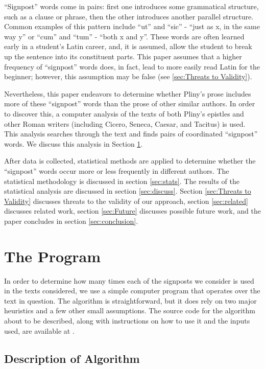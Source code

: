 ``Signpost'' words come in pairs: first one introduces some grammatical structure, such as a clause or phrase, then the other introduces another parallel structure. Common examples of this pattern include ``ut'' and ``sic'' - ``just as x, in the same way y'' or ``cum'' and ``tum'' - ``both x and y''. These words are often learned early in a student's Latin career, and, it is assumed, allow the student to break up the sentence into its constituent parts. This paper assumes that a higher frequency of ``signpost'' words does, in fact, lead to more easily read Latin for the beginner; however, this assumption may be false (see \ref{sec:Threats to Validity}).

Nevertheless, this paper endeavors to determine whether Pliny's prose includes more of these ``signpost'' words than the prose of other similar authors. In order to discover this, a computer analysis of the texts of both Pliny's epistles and other Roman writers (including Cicero, Seneca, Caesar, and Tacitus) is used. This analysis searches through the text and finds pairs of coordinated ``signpost'' words. We discuss this analysis in Section \ref{sec:The Program}.
 
After data is collected, statistical methods are applied to determine whether the ``signpost'' words occur more or less frequently in different authors. The statistical methodology is discussed in section \ref{sec:stats}. The results of the statistical analysis are discussed in section \ref{sec:discuss}. Section \ref{sec:Threats to Validity} discusses threats to the validity of our approach, section \ref{sec:related} discusses related work, section \ref{sec:Future} discusses possible future work, and the paper concludes in section \ref{sec:conclusion}.

\section{The Program}
\label{sec:The Program}

In order to determine how many times each of the signposts we consider is used in the texts considered, we use a simple computer program that operates over the text in question. The algorithm is straightforward, but it does rely on two major heuristics and a few other small assumptions. The source code for the algorithm about to be described, along with instructions on how to use it and the inputs used, are available at \cite{github}.

\subsection{Description of Algorithm}

